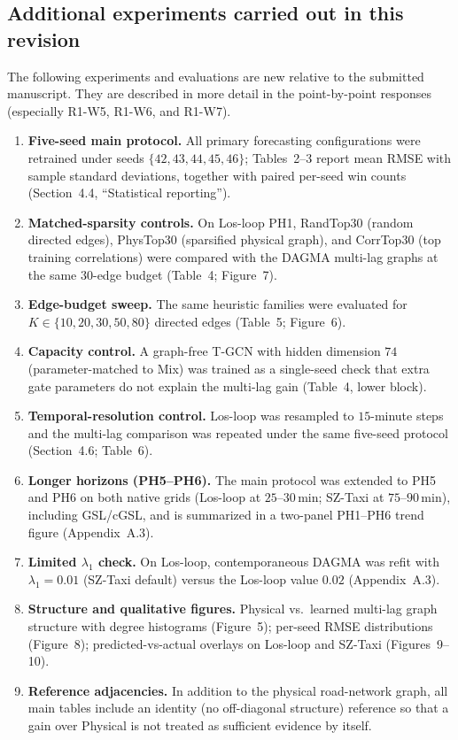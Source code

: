 \documentclass[a4paper,11pt]{article}
\begin{document}
\subsection*{Additional experiments carried out in this revision}

The following experiments and evaluations are new relative to the submitted manuscript. They are described in more detail in the point-by-point responses (especially R1-W5, R1-W6, and R1-W7).

\begin{enumerate}
    \item \textbf{Five-seed main protocol.} All primary forecasting configurations were retrained under seeds $\{42,43,44,45,46\}$; Tables~2--3 report mean RMSE with sample standard deviations, together with paired per-seed win counts (Section~4.4, ``Statistical reporting'').
    \item \textbf{Matched-sparsity controls.} On Los-loop PH1, RandTop30 (random directed edges), PhysTop30 (sparsified physical graph), and CorrTop30 (top training correlations) were compared with the DAGMA multi-lag graphs at the same $30$-edge budget (Table~4; Figure~7).
    \item \textbf{Edge-budget sweep.} The same heuristic families were evaluated for $K\in\{10,20,30,50,80\}$ directed edges (Table~5; Figure~6).
    \item \textbf{Capacity control.} A graph-free T-GCN with hidden dimension $74$ (parameter-matched to Mix) was trained as a single-seed check that extra gate parameters do not explain the multi-lag gain (Table~4, lower block).
    \item \textbf{Temporal-resolution control.} Los-loop was resampled to $15$-minute steps and the multi-lag comparison was repeated under the same five-seed protocol (Section~4.6; Table~6).
    \item \textbf{Longer horizons (PH5--PH6).} The main protocol was extended to PH5 and PH6 on both native grids (Los-loop at $25$--$30$\,min; SZ-Taxi at $75$--$90$\,min), including GSL/cGSL, and is summarized in a two-panel PH1--PH6 trend figure (Appendix~A.3).
    \item \textbf{Limited $\lambda_1$ check.} On Los-loop, contemporaneous DAGMA was refit with $\lambda_1=0.01$ (SZ-Taxi default) versus the Los-loop value $0.02$ (Appendix~A.3).
    \item \textbf{Structure and qualitative figures.} Physical vs.\ learned multi-lag graph structure with degree histograms (Figure~5); per-seed RMSE distributions (Figure~8); predicted-vs-actual overlays on Los-loop and SZ-Taxi (Figures~9--10).
    \item \textbf{Reference adjacencies.} In addition to the physical road-network graph, all main tables include an identity (no off-diagonal structure) reference so that a gain over Physical is not treated as sufficient evidence by itself.
\end{enumerate}
\end{document}
